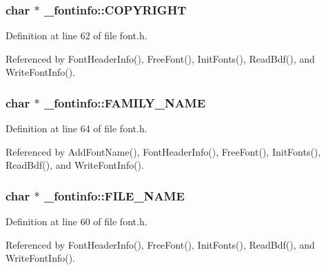 \subsubsection[{\texorpdfstring{C\+O\+P\+Y\+R\+I\+G\+HT}{COPYRIGHT}}]{\setlength{\rightskip}{0pt plus 5cm}char $\ast$ \+\_\+fontinfo\+::\+C\+O\+P\+Y\+R\+I\+G\+HT}\hypertarget{struct__fontinfo_a7f4b0949fe49cf3fac04f225e1f36ed2}{}\label{struct__fontinfo_a7f4b0949fe49cf3fac04f225e1f36ed2}


Definition at line 62 of file font.\+h.



Referenced by Font\+Header\+Info(), Free\+Font(), Init\+Fonts(), Read\+Bdf(), and Write\+Font\+Info().

\subsubsection[{\texorpdfstring{F\+A\+M\+I\+L\+Y\+\_\+\+N\+A\+ME}{FAMILY_NAME}}]{\setlength{\rightskip}{0pt plus 5cm}char $\ast$ \+\_\+fontinfo\+::\+F\+A\+M\+I\+L\+Y\+\_\+\+N\+A\+ME}\hypertarget{struct__fontinfo_a4af43750caadb3ae9d7375f0afdcd171}{}\label{struct__fontinfo_a4af43750caadb3ae9d7375f0afdcd171}


Definition at line 64 of file font.\+h.



Referenced by Add\+Font\+Name(), Font\+Header\+Info(), Free\+Font(), Init\+Fonts(), Read\+Bdf(), and Write\+Font\+Info().

\subsubsection[{\texorpdfstring{F\+I\+L\+E\+\_\+\+N\+A\+ME}{FILE_NAME}}]{\setlength{\rightskip}{0pt plus 5cm}char $\ast$ \+\_\+fontinfo\+::\+F\+I\+L\+E\+\_\+\+N\+A\+ME}\hypertarget{struct__fontinfo_a86ca02a864b7dccb21004f51bea22ed3}{}\label{struct__fontinfo_a86ca02a864b7dccb21004f51bea22ed3}


Definition at line 60 of file font.\+h.



Referenced by Font\+Header\+Info(), Free\+Font(), Init\+Fonts(), Read\+Bdf(), and Write\+Font\+Info().

